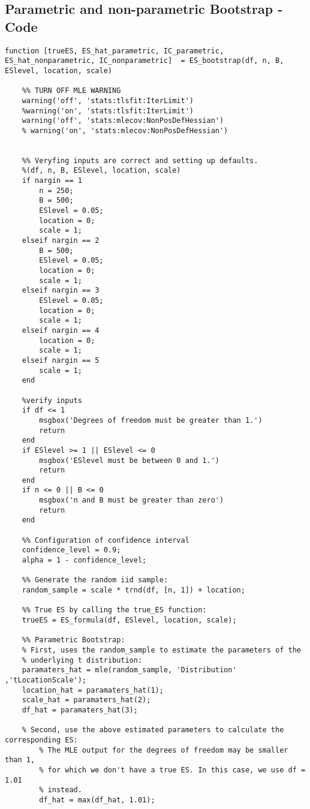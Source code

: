 \documentclass[11pt, a4paper]{article}
\begin{document}
\newpage
\subsection{Parametric and non-parametric Bootstrap - Code}
\begin{lstlisting}[style=Matlab-editor]
function [trueES, ES_hat_parametric, IC_parametric, ES_hat_nonparametric, IC_nonparametric]  = ES_bootstrap(df, n, B, ESlevel, location, scale)
    
    %% TURN OFF MLE WARNING
    warning('off', 'stats:tlsfit:IterLimit')
    %warning('on', 'stats:tlsfit:IterLimit')
    warning('off', 'stats:mlecov:NonPosDefHessian')
    % warning('on', 'stats:mlecov:NonPosDefHessian')
    
    
    %% Veryfing inputs are correct and setting up defaults.
    %(df, n, B, ESlevel, location, scale)
    if nargin == 1
        n = 250;
        B = 500;
        ESlevel = 0.05;
        location = 0;
        scale = 1;
    elseif nargin == 2
        B = 500;
        ESlevel = 0.05;
        location = 0;
        scale = 1;
    elseif nargin == 3
        ESlevel = 0.05;
        location = 0;
        scale = 1;
    elseif nargin == 4
        location = 0;
        scale = 1;
    elseif nargin == 5
        scale = 1;
    end

    %verify inputs
    if df <= 1
        msgbox('Degrees of freedom must be greater than 1.')
        return
    end
    if ESlevel >= 1 || ESlevel <= 0
        msgbox('ESlevel must be between 0 and 1.')
        return
    end
    if n <= 0 || B <= 0
        msgbox('n and B must be greater than zero')
        return
    end
    
    %% Configuration of confidence interval
    confidence_level = 0.9;
    alpha = 1 - confidence_level;
    
    %% Generate the random iid sample:
    random_sample = scale * trnd(df, [n, 1]) + location;
    
    %% True ES by calling the true_ES function:
    trueES = ES_formula(df, ESlevel, location, scale);
    
    %% Parametric Bootstrap:
    % First, uses the random_sample to estimate the parameters of the
    % underlying t distribution:
    paramaters_hat = mle(random_sample, 'Distribution' ,'tLocationScale');
    location_hat = paramaters_hat(1);
    scale_hat = paramaters_hat(2);
    df_hat = paramaters_hat(3);
    
    % Second, use the above estimated parameters to calculate the corresponding ES:
        % The MLE output for the degrees of freedom may be smaller than 1,     
        % for which we don't have a true ES. In this case, we use df = 1.01
        % instead.
        df_hat = max(df_hat, 1.01); 
    

\end{lstlisting}
\end{document}
